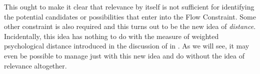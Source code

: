 This ought to make it clear that relevance by itself is not sufficient for identifying the potential candidates or possibilities that enter into the Flow Constraint. Some other constraint is also required and this turns out to be the new idea of \emph{distance}. Incidentally, this idea has nothing to do with the measure of weighted psychological distance introduced in the discussion of  in . As we will see, it may even be possible to manage just with this new idea and do without the idea of relevance altogether.


